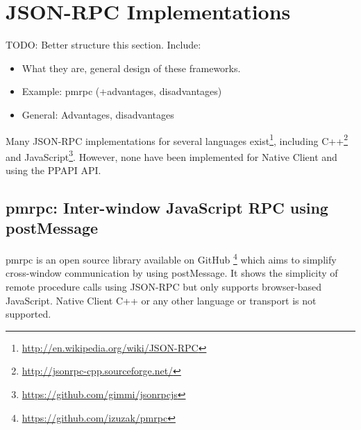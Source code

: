 

\section{JSON-RPC Implementations} %

TODO: Better structure this section. Include:
\begin{itemize}
	\item What they are, general design of these frameworks.
	\item Example: pmrpc (+advantages, disadvantages)
	\item General: Advantages, disadvantages
\end{itemize}

\label{sec:json_rpc_implementations}
Many JSON-RPC implementations for several languages exist\footnote{\url{http://en.wikipedia.org/wiki/JSON-RPC}}, including C++\footnote{\url{http://jsonrpc-cpp.sourceforge.net/}} and JavaScript\footnote{\url{https://github.com/gimmi/jsonrpcjs}}. However, none have been implemented for Native Client and using the PPAPI API.

\subsection{pmrpc: Inter-window JavaScript RPC using postMessage} %
\label{sub:pmrpc_json_rpc_using_postmessage}
pmrpc is an open source library available on GitHub \footnote{\url{https://github.com/izuzak/pmrpc}} which aims to simplify cross-window communication by using postMessage. It shows the simplicity of remote procedure calls using JSON-RPC but only supports browser-based JavaScript. Native Client C++ or any other language or transport is not supported.

